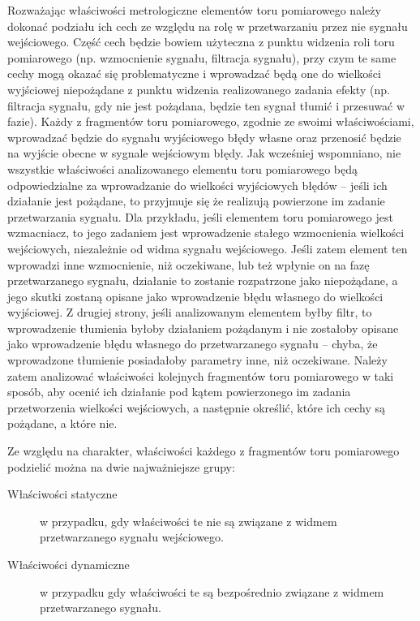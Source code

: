 Rozważając właściwości metrologiczne elementów toru pomiarowego należy dokonać podziału ich cech ze względu na rolę w przetwarzaniu przez nie sygnału wejściowego. Część cech będzie bowiem użyteczna z punktu widzenia roli toru pomiarowego (np. wzmocnienie sygnału, filtracja sygnału), przy czym te same cechy mogą okazać się problematyczne i wprowadzać będą one do wielkości wyjściowej niepożądane z punktu widzenia realizowanego zadania efekty (np. filtracja sygnału, gdy nie jest pożądana, będzie ten sygnał tłumić i przesuwać w fazie). Każdy z fragmentów toru pomiarowego, zgodnie ze swoimi właściwościami, wprowadzać będzie do sygnału wyjściowego błędy własne oraz przenosić będzie na wyjście obecne w sygnale wejściowym błędy. Jak wcześniej wspomniano, nie wszystkie właściwości analizowanego elementu toru pomiarowego będą odpowiedzialne za wprowadzanie do wielkości wyjściowych błędów -- jeśli ich działanie jest pożądane, to przyjmuje się że realizują powierzone im zadanie przetwarzania sygnału. Dla przykładu, jeśli elementem toru pomiarowego jest wzmacniacz, to jego zadaniem jest wprowadzenie stałego wzmocnienia wielkości wejściowych, niezależnie od widma sygnału wejściowego. Jeśli zatem element ten wprowadzi inne wzmocnienie, niż oczekiwane, lub też wpłynie on na fazę przetwarzanego sygnału, działanie to zostanie rozpatrzone jako niepożądane, a jego skutki zostaną opisane jako wprowadzenie błędu własnego do wielkości wyjściowej. Z drugiej strony, jeśli analizowanym elementem byłby filtr, to wprowadzenie tłumienia byłoby działaniem pożądanym i nie zostałoby opisane jako wprowadzenie błędu własnego do przetwarzanego sygnału -- chyba, że wprowadzone tłumienie posiadałoby parametry inne, niż oczekiwane. Należy zatem analizować właściwości kolejnych fragmentów toru pomiarowego w taki sposób, aby ocenić ich działanie pod kątem powierzonego im zadania przetworzenia wielkości wejściowych, a następnie określić, które ich cechy są pożądane, a które nie.

Ze względu na charakter, właściwości każdego z fragmentów toru pomiarowego podzielić można na dwie najważniejsze grupy:
\begin{description}
\item [Właściwości statyczne] w przypadku, gdy właściwości te nie są związane z widmem przetwarzanego sygnału wejściowego.
\item [Właściwości dynamiczne] w przypadku gdy właściwości te są bezpośrednio związane z widmem przetwarzanego sygnału.
\end{description}

